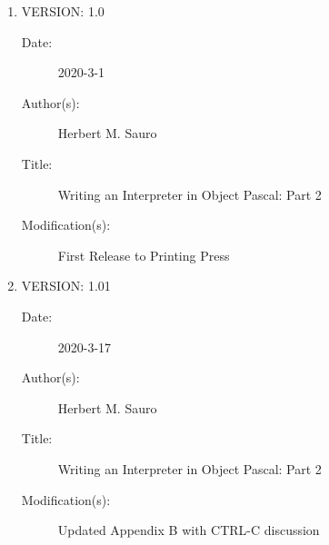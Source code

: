\documentclass[11pt,twosided]{book}
\begin{document}
\begin{enumerate}

\item VERSION: 1.0
\begin{description}
\item[Date:] 2020-3-1
\item[Author(s):] Herbert M. Sauro
\item[Title:] Writing an Interpreter in Object Pascal: Part 2
\item[Modification(s):] First Release to Printing Press
\end{description}

\item VERSION: 1.01
\begin{description}
\item[Date:] 2020-3-17
\item[Author(s):] Herbert M. Sauro
\item[Title:] Writing an Interpreter in Object Pascal: Part 2
\item[Modification(s):] Updated Appendix B with CTRL-C discussion
\end{description}


\end{enumerate}

\cleardoublepage
{}
{}
\printindex

\myclearpage
\end{document}
